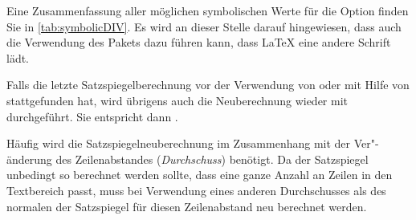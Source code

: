 Eine Zusammenfassung aller möglichen symbolischen Werte für die Option
 finden Sie in \autoref{tab:symbolicDIV}. Es wird an dieser Stelle
darauf hingewiesen, dass auch die Verwendung des Pakets
 dazu führen kann, dass \LaTeX{} eine
andere Schrift lädt.

Falls die letzte Satzspiegelberechnung vor der Verwendung von
 oder  mit Hilfe von
 stattgefunden hat, wird
übrigens auch die Neuberechnung wieder mit 
durchgeführt. Sie entspricht dann
%
%
.

\begin{table}
  \caption[{%
    Symbolische Werte für Option  und das
    -Argument von %
  }]{%
    Mögliche symbolische Werte für die Option 
    oder das -Argument der Anweisung
  }
  \label{tab:symbolicDIV}
  \begin{desctabular}
  \end{desctabular}
\end{table}

Häufig wird die Satzspiegelneuberechnung im Zusammenhang
mit der Ver"-änderung des Zeilenabstandes
(\emph{Durchschuss}) benötigt. Da der Satzspiegel unbedingt
so berechnet werden sollte, dass eine ganze Anzahl an Zeilen in den
Textbereich passt, muss bei Verwendung eines anderen Durchschusses als des
normalen der Satzspiegel für diesen Zeilenabstand neu berechnet werden.

